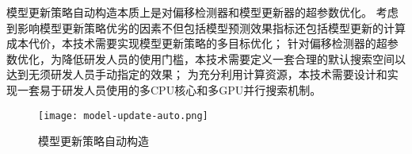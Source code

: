 模型更新策略自动构造本质上是对偏移检测器和模型更新器的超参数优化。
考虑到影响模型更新策略优劣的因素不但包括模型预测效果指标还包括模型更新的计算成本代价，本技术需要实现模型更新策略的多目标优化；
针对偏移检测器的超参数优化，为降低研发人员的使用门槛，本技术需要定义一套合理的默认搜索空间以达到无须研发人员手动指定的效果；
为充分利用计算资源，本技术需要设计和实现一套易于研发人员使用的多CPU核心和多GPU并行搜索机制。

\begin{figure}
  \centering
  \texttt{[image: model-update-auto.png]}
  \caption{模型更新策略自动构造}
  \label{fig:automodelupdate}
\end{figure}
